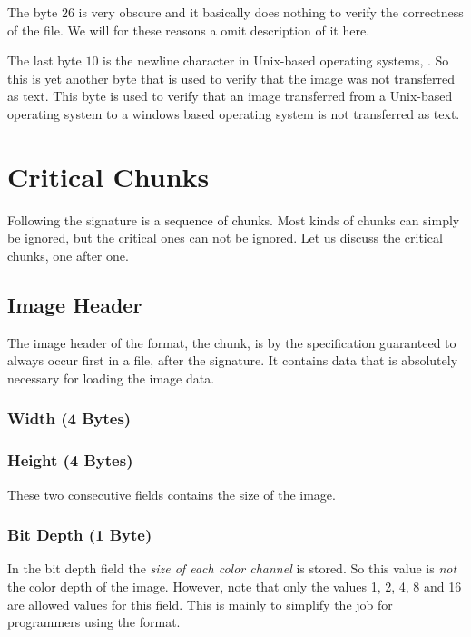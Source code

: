 The byte $26$ is very obscure and it basically does nothing to verify
the correctness of the file. We will for these reasons a omit
description of it here.

The last byte $10$ is the newline character in Unix-based operating
systems, \lf. So this is yet another byte that is used to verify that
the image was not transferred as text. This byte is used to verify
that an image transferred from a Unix-based operating system to a
windows based operating system is not transferred as \ascii text.

\section{Critical Chunks}

Following the \png signature is a sequence of chunks. Most kinds of
chunks can simply be ignored, but the critical ones can not be
ignored. Let us discuss the critical chunks, one after one.

\subsection{Image Header}

The image header of the \png format, the \ihdr chunk, is by the
\png specification guaranteed to always occur first in a \png file,
after the \png signature. It contains data that is absolutely necessary
for loading the image data.

\subsubsection*{Width (4 Bytes)}
\subsubsection*{Height (4 Bytes)}

These two consecutive fields contains the size of the image.

\subsubsection*{Bit Depth (1 Byte)}

In the bit depth field the \textit{size of each color channel} is
stored. So this value is \textit{not} the color depth of the
image. However, note that only the values 1, 2, 4, 8 and 16 are
allowed values for this field. This is mainly to simplify the job for
programmers using the \png format.

